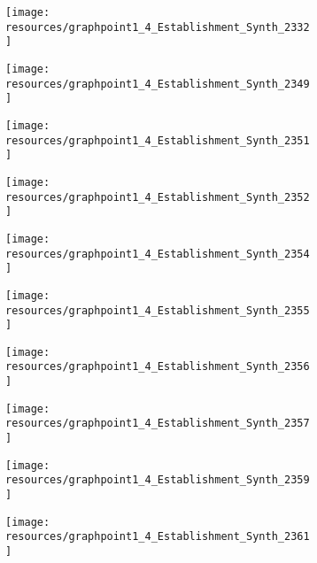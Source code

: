 \documentclass[12pt]{article}
\begin{document}
\begin{figure}[H]
	\centering
	\begin{subfigure}[b]{0.4\textwidth}
	    \texttt{[image: resources/graphpoint1\_4\_Establishment\_Synth\_2332]}
	\end{subfigure}
	\begin{subfigure}[b]{0.4\textwidth}
	    \texttt{[image: resources/graphpoint1\_4\_Establishment\_Synth\_2349]}
	\end{subfigure}
\end{figure}

\begin{figure}[H]
	\centering
	\begin{subfigure}[b]{0.4\textwidth}
	    \texttt{[image: resources/graphpoint1\_4\_Establishment\_Synth\_2351]}
	\end{subfigure}
	\begin{subfigure}[b]{0.4\textwidth}
	    \texttt{[image: resources/graphpoint1\_4\_Establishment\_Synth\_2352]}
	\end{subfigure}
\end{figure}

\begin{figure}[H]
	\centering
	\begin{subfigure}[b]{0.4\textwidth}
	    \texttt{[image: resources/graphpoint1\_4\_Establishment\_Synth\_2354]}
	\end{subfigure}
	\begin{subfigure}[b]{0.4\textwidth}
	    \texttt{[image: resources/graphpoint1\_4\_Establishment\_Synth\_2355]}
	\end{subfigure}
\end{figure}

\begin{figure}[H]
	\centering
	\begin{subfigure}[b]{0.4\textwidth}
	    \texttt{[image: resources/graphpoint1\_4\_Establishment\_Synth\_2356]}
	\end{subfigure}
	\begin{subfigure}[b]{0.4\textwidth}
	    \texttt{[image: resources/graphpoint1\_4\_Establishment\_Synth\_2357]}
	\end{subfigure}
\end{figure}

\begin{figure}[H]
	\centering
	\begin{subfigure}[b]{0.4\textwidth}
	    \texttt{[image: resources/graphpoint1\_4\_Establishment\_Synth\_2359]}
	\end{subfigure}
	\begin{subfigure}[b]{0.4\textwidth}
	    \texttt{[image: resources/graphpoint1\_4\_Establishment\_Synth\_2361]}
	\end{subfigure}
\end{figure}
\end{document}
